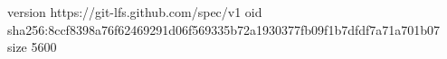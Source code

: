 version https://git-lfs.github.com/spec/v1
oid sha256:8ccf8398a76f62469291d06f569335b72a1930377fb09f1b7dfdf7a71a701b07
size 5600
